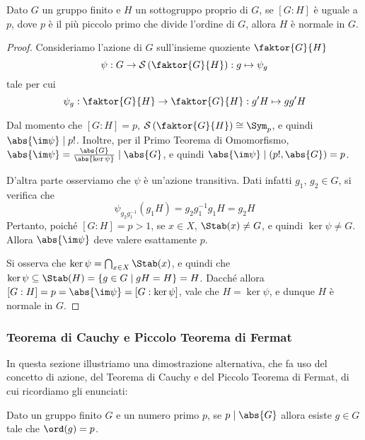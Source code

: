 \documentclass[11pt]{scrartcl}
\begin{document}
	\begin{proposition}
		\label{prop1.52}
		Dato $G$ un gruppo finito e $H$ un sottogruppo proprio di $G$, se $[G:H]$ è uguale
		a $p$, dove
		$p$ è il più piccolo primo che divide l'ordine di $G$, allora $H$ è normale
		in $G$.
	\end{proposition}
	
	\begin{proof}
		Consideriamo l'azione di $G$ sull'insieme quoziente $\faktor{G}{H}$ 
		\[
		\psi: G \to \mathcal{S}\left(\faktor{G}{H}\right) : g \mapsto \psi_g
		\]
		tale per cui
		\[
		\psi_g : \faktor{G}{H} \to \faktor{G}{H} : g'H \mapsto gg'H
		\]
		
		Dal momento che $[G : H] = p$, $\mathcal{S}\left(\faktor{G}{H}\right) \cong \Sym_p$,
		e quindi $\abs{\im \psi} \mid p!$. Inoltre, per il Primo Teorema di Omomorfismo,
		$\abs{\im \psi} = \frac{\abs{G}}{\abs{\ker \psi}} \mid \abs{G}$, e quindi
		$\abs{\im \psi} \mid (p!, \abs{G}) = p$. \medskip
		

		D'altra parte osserviamo che $\psi$ è un'azione transitiva. Dati infatti
		$g_1$, $g_2 \in G$, si verifica che
		\[ \psi_{g_2 g_1^{-1}}(g_1H) = g_2g_1^{-1}g_1H = g_2H \]
		Pertanto, poiché $[G : H] = p > 1$, se $x \in X$, $\Stab(x) \neq G$, e quindi
		$\ker \psi \neq G$. Allora $\abs{\im \psi}$ deve valere esattamente $p$. \medskip
		
		
		Si osserva che $\ker \psi = \bigcap_{x \in X} \Stab(x)$, e quindi
		che $\ker \psi \subseteq \Stab(H) = \{g \in G \mid gH = H \} = H$.
		Dacché allora $[G : H] = p = \abs{\im \psi} = [G : \ker \psi]$, vale
		che $H = \ker \psi$, e dunque $H$ è normale in $G$.
	\end{proof}
	
	
	\subsubsection{Teorema di Cauchy e Piccolo Teorema di Fermat}
	
	In questa sezione illustriamo una dimostrazione alternativa, che fa uso del concetto di
	azione, del Teorema di Cauchy e del Piccolo
	Teorema di Fermat, di cui ricordiamo gli enunciati:
	
	\begin{theorem}
		\label{teorema1.44}
		Dato un gruppo finito $G$ e un numero primo $p$, se $p \mid \abs{G}$ allora esiste 
		$g \in G$ tale che $\ord(g) = p$.
	\end{theorem}
	
\end{document}
